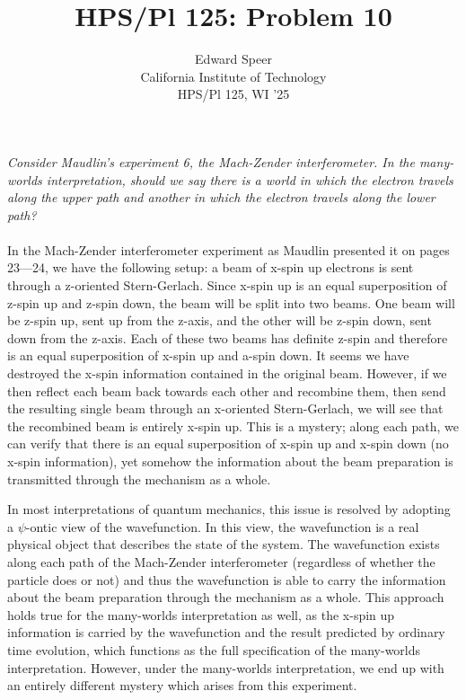 \documentclass[11pt, a4paper]{article}
\title{HPS/Pl 125: Problem 10}
\author{%
  Edward Speer
  \\
  California Institute of Technology\\
  HPS/Pl 125, WI '25 \\
}
\date{\monthyeardate}
\begin{document}
\maketitle

\noindent \emph{Consider Maudlin's experiment 6, the Mach-Zender interferometer.
                In the many-worlds interpretation, should we say there is a
                world in which the electron travels along the upper path and 
                another in which the electron travels along the lower path?}
\\ \hfill \\

In the Mach-Zender interferometer experiment as Maudlin presented it on pages 
23—24, we have the following setup: a beam of x-spin up electrons is sent
through a z-oriented Stern-Gerlach. Since x-spin up is an equal superposition of
z-spin up and z-spin down, the beam will be split into two beams. One beam will
be z-spin up, sent up from the z-axis, and the other will be z-spin down, sent
down from the z-axis. Each of these two beams has definite z-spin and therefore
is an equal superposition of x-spin up and a-spin down. It seems we have
destroyed the x-spin information contained in the original beam. However, if we
then reflect each beam back towards each other and recombine them, then send the
resulting single beam through an x-oriented Stern-Gerlach, we will see that the
recombined beam is entirely x-spin up. This is a mystery; along each path, we
can verify that there is an equal superposition of x-spin up and x-spin down 
(no x-spin information), yet somehow the information about the beam preparation
is transmitted through the mechanism as a whole.

In most interpretations of quantum mechanics, this issue is resolved by adopting
a $\psi$-ontic view of the wavefunction. In this view, the wavefunction is a
real physical object that describes the state of the system. The wavefunction
exists along each path of the Mach-Zender interferometer (regardless of whether
the particle does or not) and thus the wavefunction is able to carry the
information about the beam preparation through the mechanism as a whole. This
approach holds true for the many-worlds interpretation as well, as the
x-spin up information is carried by the wavefunction and the result predicted
by ordinary time evolution, which functions as the full specification of the
many-worlds interpretation. However, under the many-worlds interpretation, we
end up with an entirely different mystery which arises from this experiment.
\end{document}
